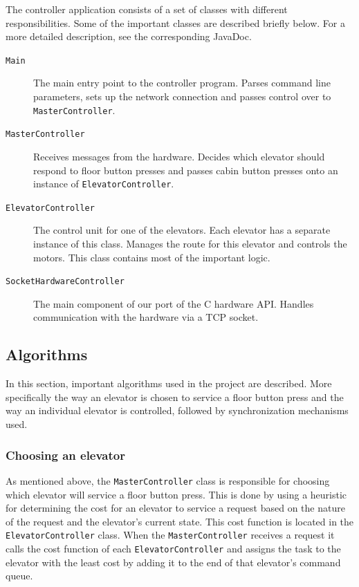 \documentclass[a4paper]{article}
\begin{document}
The controller application consists of a set of classes with different
responsibilities. Some of the important classes are described briefly below. For
a more detailed description, see the corresponding JavaDoc.

\begin{description}

\item[\texttt{Main}] The main entry point to the controller program. Parses
    command line parameters, sets up the network connection and passes control
    over to \texttt{MasterController}.

\item[\texttt{MasterController}] Receives messages from the hardware. Decides
    which elevator should respond to floor button presses and passes cabin
    button presses onto an instance of \texttt{ElevatorController}.

\item[\texttt{ElevatorController}] The control unit for one of the elevators.
    Each elevator has a separate instance of this class. Manages the route for
    this elevator and controls the motors. This class contains most of the
    important logic.

\item[\texttt{SocketHardwareController}] The main component of our port of the C
    hardware API. Handles communication with the hardware via a TCP socket.

\end{description}

\subsection{Algorithms}
In this section, important algorithms used in the project are described. More
specifically the way an elevator is chosen to service a floor button press and
the way an individual elevator is controlled, followed by synchronization
mechanisms used.

\subsubsection{Choosing an elevator}

As mentioned above, the \texttt{MasterController} class is responsible for
choosing which elevator will service a floor button press. This is done by using
a heuristic for determining the cost for an elevator to service a request based
on the nature of the request and the elevator's current state. This cost
function is located in the \texttt{ElevatorController} class. When the
\texttt{MasterController} receives a request it calls the cost function of each
\texttt{ElevatorController} and assigns the task to the elevator with the least
cost by adding it to the end of that elevator's command queue.
\end{document}
